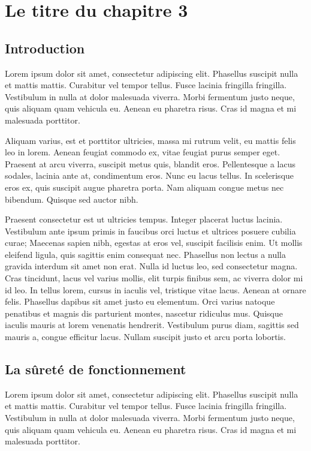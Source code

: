 %
\chapter{Le titre du chapitre 3}
%
\section{Introduction}
Lorem ipsum dolor sit amet, consectetur adipiscing elit. Phasellus suscipit nulla et mattis mattis. Curabitur vel tempor tellus. 
Fusce lacinia fringilla fringilla. Vestibulum in nulla at dolor malesuada viverra. Morbi fermentum justo neque, quis aliquam quam vehicula eu. 
Aenean eu pharetra risus. Cras id magna et mi malesuada porttitor.

Aliquam varius, est et porttitor ultricies, massa mi rutrum velit, eu mattis felis leo in lorem. 
Aenean feugiat commodo ex, vitae feugiat purus semper eget. Praesent at arcu viverra, suscipit metus quis, blandit eros. 
Pellentesque a lacus sodales, lacinia ante at, condimentum eros. Nunc eu lacus tellus. In scelerisque eros ex, quis suscipit augue pharetra porta. 
Nam aliquam congue metus nec bibendum. Quisque sed auctor nibh.

Praesent consectetur est ut ultricies tempus. Integer placerat luctus lacinia. 
Vestibulum ante ipsum primis in faucibus orci luctus et ultrices posuere cubilia curae; Maecenas sapien nibh, egestas at eros vel, suscipit facilisis enim. 
Ut mollis eleifend ligula, quis sagittis enim consequat nec. Phasellus non lectus a nulla gravida interdum sit amet non erat. 
Nulla id luctus leo, sed consectetur magna. Cras tincidunt, lacus vel varius mollis, elit turpis finibus sem, ac viverra dolor mi id leo. 
In tellus lorem, cursus in iaculis vel, tristique vitae lacus. Aenean at ornare felis. Phasellus dapibus sit amet justo eu elementum. 
Orci varius natoque penatibus et magnis dis parturient montes, nascetur ridiculus mus. Quisque iaculis mauris at lorem venenatis hendrerit. 
Vestibulum purus diam, sagittis sed mauris a, congue efficitur lacus. Nullam suscipit justo et arcu porta lobortis.

\section{La sûreté de fonctionnement}
Lorem ipsum dolor sit amet, consectetur adipiscing elit. Phasellus suscipit nulla et mattis mattis. Curabitur vel tempor tellus. 
Fusce lacinia fringilla fringilla. Vestibulum in nulla at dolor malesuada viverra. Morbi fermentum justo neque, quis aliquam quam vehicula eu. 
Aenean eu pharetra risus. Cras id magna et mi malesuada porttitor.

